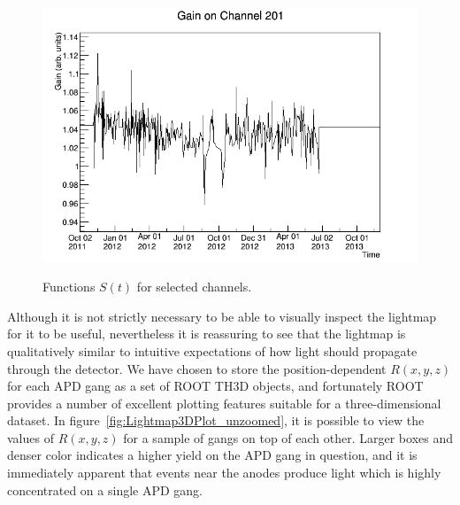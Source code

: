 \begin{figure}
\begin{center}
\includegraphics[keepaspectratio=true,width=\textwidth]{gainfunc_201.png}
\end{center}
\renewcommand{\baselinestretch}{1}
\small\normalsize
\begin{quote}
\caption{Functions $S(t)$ for selected channels.}
\label{fig:LightmapGainFunc3}
\end{quote}
\end{figure}
\renewcommand{\baselinestretch}{2}
\small\normalsize

Although it is not strictly necessary to be able to visually inspect the lightmap for it to be useful, nevertheless it is reassuring to see that the lightmap is qualitatively similar to intuitive expectations of how light should propagate through the detector.  We have chosen to store the position-dependent $R(x,y,z)$ for each APD gang as a set of ROOT TH3D objects, and fortunately ROOT provides a number of excellent plotting features suitable for a three-dimensional dataset.  In figure~\ref{fig:Lightmap3DPlot_unzoomed}, it is possible to view the values of $R(x,y,z)$ for a sample of gangs on top of each other.  Larger boxes and denser color indicates a higher yield on the APD gang in question, and it is immediately apparent that events near the anodes produce light which is highly concentrated on a single APD gang.

